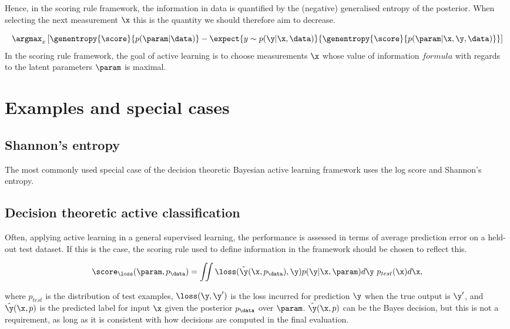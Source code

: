 Hence, in the scoring rule framework, the information in data is quantified by the (negative) generalised entropy of the posterior. When selecting the next measurement $\x$ this is the quantity we should therefore aim to decrease.

\begin{equation}
\argmax_x \left[ \genentropy{\score}{p(\param\vert\data)} - \expect{y\sim p(\y\vert \x, \data)}{\genentropy{\score}{p(\param\vert \x,\y,\data)} }\right ]
\end{equation}
In the scoring rule framework, the goal of active learning is to choose measurements $\x$ whose value of information $formula$ with regards to the latent parameters $\param$ is maximal.

\section{Examples and special cases}
\subsection{Shannon's entropy}

The most commonly used special case of the decision theoretic Bayesian active learning framework uses the log score and Shannon's entropy. 

\citep{MacKay,BALD}

\subsection{Decision theoretic active classification}

Often, applying active learning in a general supervised learning, the performance is assessed in terms of average prediction error on a held-out test dataset. If this is the case, the scoring rule used to define information in the framework should be chosen to reflect this.

\begin{equation}
\score_{\loss}(\param,p_\data) = \iint \loss(\hat{\y}(\x,p_\data),\y) p(\y\vert\x,\param) d\y\ p_{test}(\x) d\x,
\end{equation}

where $p_{test}$ is the distribution of test examples, $\loss(\y,\y')$ is the loss incurred for prediction $\y$ when the true output is $\y'$, and $\hat{\y}(\x,p)$ is the predicted label for input $\x$ given the posterior $p_\data$ over $\param$. $\hat{\y}(\x,p)$ can be the Bayes decision, but this is not a requirement, as long as it is consistent with how decisions are computed in the final evaluation.

